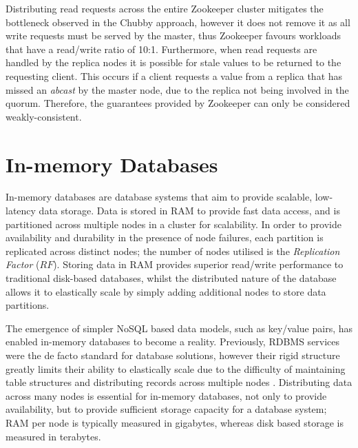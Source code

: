 	Distributing read requests across the entire Zookeeper cluster mitigates the bottleneck observed in the Chubby approach, however it does not remove it as all write requests must be served by the master, thus Zookeeper favours workloads that have a read/write ratio of 10:1. Furthermore, when read requests are handled by the replica nodes it is possible for stale values to be returned to the requesting client.  This occurs if a client requests a value from a replica that has missed an \emph{abcast} by the master node, due to the replica not being involved in the quorum.  Therefore, the guarantees provided by Zookeeper can only be considered weakly-consistent.   


\section{In-memory Databases}
In-memory databases \citep{Infinispan, Hazelcast, GridGain} are database systems that aim to provide scalable, low-latency data storage.  Data is stored in RAM to provide fast data access, and is partitioned across multiple nodes in a cluster for scalability.  In order to provide availability and durability in the presence of node failures, each partition is replicated across distinct nodes; the number of nodes utilised is the \emph{Replication Factor} ($RF$).  Storing data in RAM provides superior read/write performance to traditional disk-based databases, whilst the distributed nature of the database allows it to elastically scale by simply adding additional nodes to store data partitions.  

The emergence of simpler NoSQL based data models, such as key/value pairs, has enabled in-memory databases to become a reality.  Previously, RDBMS services were the de facto standard for database solutions, however their rigid structure greatly limits their ability to elastically scale due to the difficulty of maintaining table structures and distributing records across multiple nodes \citep{Cattell:2011:SSN:1978915.1978919, Cooper:2010:BCS:1807128.1807152}. Distributing data across many nodes is essential for in-memory databases, not only to provide availability, but to provide sufficient storage capacity for a database system; RAM per node is typically measured in gigabytes, whereas disk based storage is measured in terabytes.  

